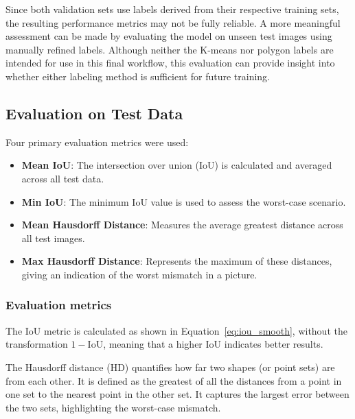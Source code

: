 Since both validation sets use labels derived from their respective training sets, the resulting performance metrics may not be fully reliable. A more meaningful assessment can be made by evaluating the model on unseen test images using manually refined labels. Although neither the K-means nor polygon labels are intended for use in this final workflow, this evaluation can provide insight into whether either labeling method is sufficient for future training.



\subsection{Evaluation on Test Data}

Four primary evaluation metrics were used:

\begin{itemize} 
\item \textbf{Mean IoU}: The intersection over union (IoU) is calculated and averaged across all test data. 
\item \textbf{Min IoU}: The minimum IoU value is used to assess the worst-case scenario. 
\item \textbf{Mean Hausdorff Distance}: Measures the average greatest distance across all test images. 
\item \textbf{Max Hausdorff Distance}: Represents the maximum of these distances, giving an indication of the worst mismatch in a picture. \end{itemize}

\subsubsection{Evaluation metrics}

The IoU metric is calculated as shown in Equation~\ref{eq:iou_smooth}, without the transformation $1 - \text{IoU}$, meaning that a higher IoU indicates better results.

The Hausdorff distance \cite{henrikson1999completeness} (HD) quantifies how far two shapes (or point sets) are from each other. It is defined as the greatest of all the distances from a point in one set to the nearest point in the other set. It captures the largest error between the two sets, highlighting the worst-case mismatch.

